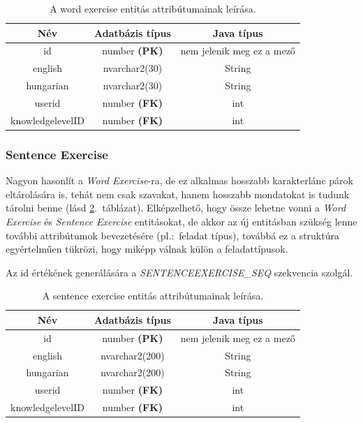 \documentclass[11pt, a4paper]{article}
\begin{document}
    \begin{table}[!h]
    	\centering
    	\begin{tabular} {|c|c|c|}
    		\hline
    		Név & Adatbázis típus & Java típus \\
    		\hline
    		id & number \textbf{(PK)} & nem jelenik meg ez a mező \\
    		english & nvarchar2(30) & String \\
    		hungarian & nvarchar2(30) & String \\
    		userid & number \textbf{(FK)} & int \\
    		knowledgelevelID & number \textbf{(FK)} & int \\
    		\hline
    	\end{tabular}
		\caption{A word exercise entitás attribútumainak leírása.}
		\label{tab:word-exercise}
    \end{table}
    
    \subsubsection{Sentence Exercise}
    Nagyon hasonlít a \textit{Word Exercise}-ra, de ez alkalmas hosszabb karakterlánc párok eltárolására is, tehát nem csak szavakat, hanem hosszabb mondatokat is tudunk tárolni benne (lásd \ref{tab:sentence-exercise}.~táblázat). Elképzelhető, hogy össze lehetne vonni a \textit{Word Exercise} és \textit{Sentence Exercise} entitásokat, de akkor az új entitásban szükség lenne további attribútumok bevezetésére (pl.:~feladat típus), továbbá ez a struktúra egyértelműen tükrözi, hogy miképp válnak külön a feladattípusok.
    
    Az id értékének generálására a \textit{SENTENCEEXERCISE\_SEQ} szekvencia szolgál.
    
    \begin{table}[!h]
    	\centering
    	\begin{tabular} {|c|c|c|}
    		\hline
    		Név & Adatbázis típus & Java típus \\
    		\hline
    		id & number \textbf{(PK)} & nem jelenik meg ez a mező \\
    		english & nvarchar2(200) & String \\
    		hungarian & nvarchar2(200) & String \\
    		userid & number \textbf{(FK)} & int \\
    		knowledgelevelID & number \textbf{(FK)} & int \\
    		\hline
    	\end{tabular}
    	\caption{A sentence exercise entitás attribútumainak leírása.}
		\label{tab:sentence-exercise}
    \end{table}
    
\end{document}
